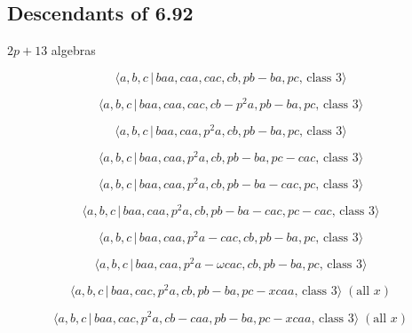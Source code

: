 \documentclass[10pt]{article}
\begin{document}
\subsection{Descendants of 6.92}

$2p+13$ algebras

\begin{equation}
\langle a,b,c\,|\,baa,caa,cac,cb,pb-ba,pc,\,\text{class }3\rangle 
\tag{7.2792}
\end{equation}

\begin{equation}
\langle a,b,c\,|\,baa,caa,cac,cb-p^2a,pb-ba,pc,\,\text{class }3\rangle 
\tag{7.2793}
\end{equation}

\begin{equation}
\langle a,b,c\,|\,baa,caa,p^2a,cb,pb-ba,pc,\,\text{class }3\rangle 
\tag{7.2794}
\end{equation}

\begin{equation}
\langle a,b,c\,|\,baa,caa,p^2a,cb,pb-ba,pc-cac,\,\text{class }3\rangle 
\tag{7.2795}
\end{equation}

\begin{equation}
\langle a,b,c\,|\,baa,caa,p^2a,cb,pb-ba-cac,pc,\,\text{class }3\rangle 
\tag{7.2796}
\end{equation}

\begin{equation}
\langle a,b,c\,|\,baa,caa,p^2a,cb,pb-ba-cac,pc-cac,\,\text{class }3\rangle 
\tag{7.2797}
\end{equation}

\begin{equation}
\langle a,b,c\,|\,baa,caa,p^2a-cac,cb,pb-ba,pc,\,\text{class }3\rangle 
\tag{7.2798}
\end{equation}

\begin{equation}
\langle a,b,c\,|\,baa,caa,p^{2}a-\omega cac,cb,pb-ba,pc,\,\text{class }%
3\rangle  \tag{7.2799}
\end{equation}

\begin{equation}
\langle a,b,c\,|\,baa,cac,p^2a,cb,pb-ba,pc-xcaa,\,\text{class }3\rangle \;(%
\text{all }x)  \tag{7.2800}
\end{equation}

\begin{equation}
\langle a,b,c\,|\,baa,cac,p^2a,cb-caa,pb-ba,pc-xcaa,\,\text{class }3\rangle
\;(\text{all }x)  \tag{7.2801}
\end{equation}
\end{document}
